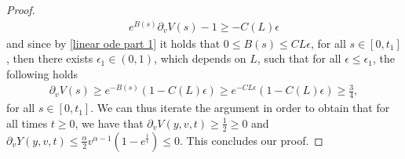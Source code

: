 \documentclass[10pt,a4paper]{amsart}
\begin{document}
\begin{proof}
\begin{align*}
e^{B(s)}\partial_{v}V(s)-1\geq -C(L)\epsilon
\end{align*}
and since by \eqref{linear ode part 1} it holds that $0\leq B(s)\leq CL\epsilon$, for all $s\in[0,t_{1}]$, then there exists $\epsilon_{1}\in(0,1)$, which depends on $L$, such that for all $\epsilon\leq \epsilon_{1}$, the following holds
\begin{align*}
    \partial_{v}V(s)\geq e^{-B(s)}(1-C(L)\epsilon)\geq e^{-CL\epsilon}(1-C(L)\epsilon)\geq \frac{3}{4},
\end{align*}
for all $s\in[0,t_{1}]$. We can thus iterate the argument in order to obtain that for all times $t\geq 0$, we have that $\partial_{v}V(y,v,t)\geq \frac{1}{2} \geq 0$ and $\partial_{v}Y(y,v,t)\leq \frac{\alpha}{2}v^{\alpha-1}(1-e^{\frac{t}{\epsilon}})\leq 0$. This concludes our proof.
 \end{proof}
\end{document}
